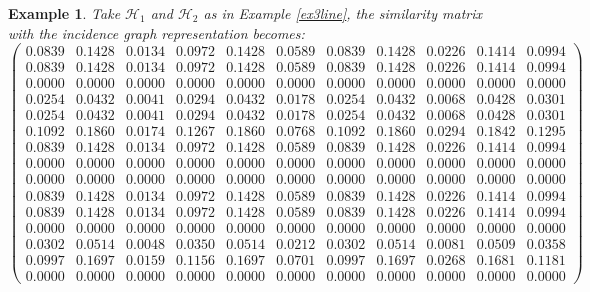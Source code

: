 \documentclass[a4paper,11pt]{report}
\newtheorem{example}[theorem]{Example}
\newcommand{\hgrafeen}{\mathcal{H}}
\begin{document}
\begin{example}\label{igex3}
Take $\hgrafeen_1$ and $\hgrafeen_2$ as in Example \ref{ex3line}, the similarity 
matrix with the incidence graph representation becomes:
$$\left(\begin{array}{llllllll|lll}
0.0839&0.1428&0.0134&0.0972&0.1428&0.0589&0.0839&0.1428&0.0226&0.1414&0.0994\\
0.0839&0.1428&0.0134&0.0972&0.1428&0.0589&0.0839&0.1428&0.0226&0.1414&0.0994\\
0.0000&0.0000&0.0000&0.0000&0.0000&0.0000&0.0000&0.0000&0.0000&0.0000&0.0000\\
0.0254&0.0432&0.0041&0.0294&0.0432&0.0178&0.0254&0.0432&0.0068&0.0428&0.0301\\
0.0254&0.0432&0.0041&0.0294&0.0432&0.0178&0.0254&0.0432&0.0068&0.0428&0.0301\\
0.1092&0.1860&0.0174&0.1267&0.1860&0.0768&0.1092&0.1860&0.0294&0.1842&0.1295\\
0.0839&0.1428&0.0134&0.0972&0.1428&0.0589&0.0839&0.1428&0.0226&0.1414&0.0994\\
0.0000&0.0000&0.0000&0.0000&0.0000&0.0000&0.0000&0.0000&0.0000&0.0000&0.0000\\
0.0000&0.0000&0.0000&0.0000&0.0000&0.0000&0.0000&0.0000&0.0000&0.0000&0.0000\\
0.0839&0.1428&0.0134&0.0972&0.1428&0.0589&0.0839&0.1428&0.0226&0.1414&0.0994\\
0.0839&0.1428&0.0134&0.0972&0.1428&0.0589&0.0839&0.1428&0.0226&0.1414&0.0994\\
0.0000&0.0000&0.0000&0.0000&0.0000&0.0000&0.0000&0.0000&0.0000&0.0000&0.0000\\
\hline
0.0302&0.0514&0.0048&0.0350&0.0514&0.0212&0.0302&0.0514&0.0081&0.0509&0.0358\\
0.0997&0.1697&0.0159&0.1156&0.1697&0.0701&0.0997&0.1697&0.0268&0.1681&0.1181\\
0.0000&0.0000&0.0000&0.0000&0.0000&0.0000&0.0000&0.0000&0.0000&0.0000&0.0000
\end{array}\right)$$

\end{example}
\end{document}
